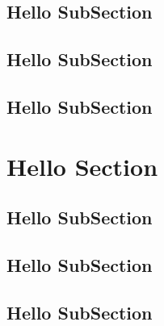 \subsection{Hello SubSection}
\lipsum[3-5]
\subsection{Hello SubSection}
\lipsum[3-5]
\subsection{Hello SubSection}
\lipsum[3-5]

\section{Hello Section}
\lipsum[3-5]
\subsection{Hello SubSection}
\lipsum[3-5]
\subsection{Hello SubSection}
\lipsum[3-5]
\subsection{Hello SubSection}
\lipsum[3-5]